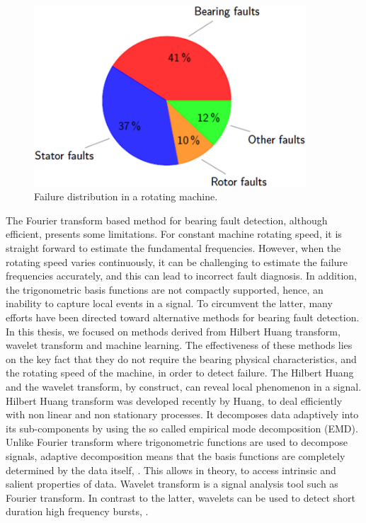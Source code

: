 \documentclass[../Main/thesis.tex]{subfiles}
\begin{document}
\begin{figure}[H] %
   \centering
   \includegraphics[width=4in]{../fig/pie.png} 
   \caption{Failure distribution in a rotating machine. }
   \label{fig:pie}
\end{figure}
\justify
The Fourier transform based method for bearing fault detection, although efficient, presents some limitations.
 For constant machine rotating speed, it is straight forward to estimate the fundamental frequencies. However, when the rotating speed varies continuously, it can be challenging to estimate the failure frequencies accurately, and this can lead to incorrect fault diagnosis. In addition, the trigonometric basis functions are not compactly supported, hence, an inability to capture local events in a signal.
\justify
To circumvent the latter, many efforts have been directed toward alternative methods for bearing fault detection. In this thesis, we focused on methods derived from Hilbert Huang transform, wavelet transform and machine learning. The effectiveness of these methods lies on the key fact that they do not require the bearing physical characteristics, and the rotating speed of the machine, in order to detect failure. The Hilbert Huang and the wavelet transform, by construct, can reveal local phenomenon in a signal.
\justify
Hilbert Huang transform was developed recently by  Huang, \cite{huang98} to deal efficiently with non linear and non stationary processes. It decomposes data adaptively 
into its sub-components by using the so called empirical mode decomposition (EMD). Unlike Fourier transform where trigonometric functions are used to decompose signals, adaptive decomposition means that 
the basis functions are completely determined by the data itself, \cite{huang08}. This allows in theory, to access intrinsic and salient properties of data.
\justify
Wavelet transform is a signal analysis tool such as Fourier transform. In contrast to the latter, wavelets can be used to detect short duration high frequency bursts, \cite{albert09}.
\end{document}
